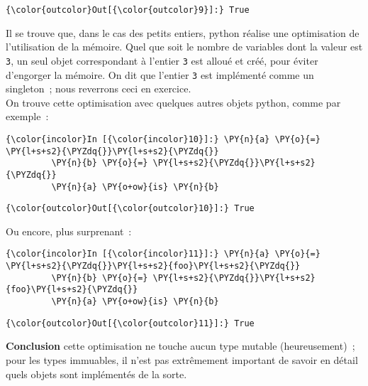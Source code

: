 \begin{Verbatim}[commandchars=\\\{\}]
{\color{outcolor}Out[{\color{outcolor}9}]:} True
\end{Verbatim}
            
    Il se trouve que, dans le cas des petits entiers, python réalise une
optimisation de l'utilisation de la mémoire. Quel que soit le nombre de
variables dont la valeur est \texttt{3}, un seul objet correspondant à
l'entier \texttt{3} est alloué et créé, pour éviter d'engorger la
mémoire. On dit que l'entier \texttt{3} est implémenté comme un
singleton~; nous reverrons ceci en exercice.\\

    On trouve cette optimisation avec quelques autres objets python, comme
par exemple~:

    \begin{Verbatim}[commandchars=\\\{\}]
{\color{incolor}In [{\color{incolor}10}]:} \PY{n}{a} \PY{o}{=} \PY{l+s+s2}{\PYZdq{}}\PY{l+s+s2}{\PYZdq{}}
         \PY{n}{b} \PY{o}{=} \PY{l+s+s2}{\PYZdq{}}\PY{l+s+s2}{\PYZdq{}}
         \PY{n}{a} \PY{o+ow}{is} \PY{n}{b}
\end{Verbatim}


\begin{Verbatim}[commandchars=\\\{\}]
{\color{outcolor}Out[{\color{outcolor}10}]:} True
\end{Verbatim}
            
    Ou encore, plus surprenant~:

    \begin{Verbatim}[commandchars=\\\{\}]
{\color{incolor}In [{\color{incolor}11}]:} \PY{n}{a} \PY{o}{=} \PY{l+s+s2}{\PYZdq{}}\PY{l+s+s2}{foo}\PY{l+s+s2}{\PYZdq{}}
         \PY{n}{b} \PY{o}{=} \PY{l+s+s2}{\PYZdq{}}\PY{l+s+s2}{foo}\PY{l+s+s2}{\PYZdq{}}
         \PY{n}{a} \PY{o+ow}{is} \PY{n}{b}
\end{Verbatim}


\begin{Verbatim}[commandchars=\\\{\}]
{\color{outcolor}Out[{\color{outcolor}11}]:} True
\end{Verbatim}
            
    \textbf{Conclusion} cette optimisation ne touche aucun type mutable
(heureusement)~; pour les types immuables, il n'est pas extrêmement
important de savoir en détail quels objets sont implémentés de la sorte.\\

